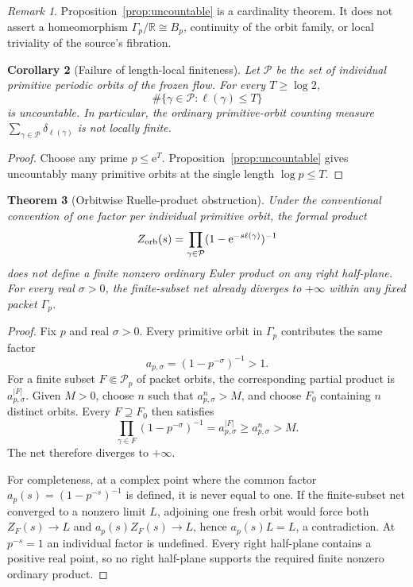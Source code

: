 \documentclass[11pt]{article}
\newtheorem{theorem}{Theorem}
\newtheorem{corollary}[theorem]{Corollary}
\theoremstyle{definition}
\theoremstyle{remark}
\newtheorem{remark}[theorem]{Remark}
\newcommand{\R}{\mathbb{R}}
\newcommand{\e}{\mathrm{e}}
\begin{document}
\begin{remark}
Proposition~\ref{prop:uncountable} is a cardinality theorem.  It does not
assert a homeomorphism \(\Gamma_p/\R\cong B_p\), continuity of the orbit
family, or local triviality of the source's fibration.
\end{remark}

\begin{corollary}[Failure of length-local finiteness]
\label{cor:notlocallyfinite}
Let \(\mathcal P\) be the set of individual primitive periodic orbits of the
frozen flow.  For every \(T\ge\log 2\),
\[
 \#\{\gamma\in\mathcal P:\ell(\gamma)\le T\}
\]
is uncountable.  In particular, the ordinary primitive-orbit counting measure
\(\sum_{\gamma\in\mathcal P}\delta_{\ell(\gamma)}\) is not locally finite.
\end{corollary}

\begin{proof}
Choose any prime \(p\le\e^T\).  Proposition~\ref{prop:uncountable} gives
uncountably many primitive orbits at the single length \(\log p\le T\).
\end{proof}

\begin{theorem}[Orbitwise Ruelle-product obstruction]
\label{thm:orbitproduct}
Under the conventional convention of one factor per individual primitive
orbit, the formal product
\begin{equation}
 Z_{\rm orb}(s)
   =\prod_{\gamma\in\mathcal P}
      (1-\e^{-s\ell(\gamma)})^{-1}
 \label{eq:orbitproduct}
\end{equation}
does not define a finite nonzero ordinary Euler product on any right
half-plane.  For every real \(\sigma>0\), the finite-subset net already
diverges to \(+\infty\) within any fixed packet \(\Gamma_p\).
\end{theorem}

\begin{proof}
Fix \(p\) and real \(\sigma>0\).  Every primitive orbit in \(\Gamma_p\)
contributes the same factor
\[
 a_{p,\sigma}=(1-p^{-\sigma})^{-1}>1.
\]
For a finite subset \(F\Subset\mathcal P_p\) of packet orbits, the
corresponding partial product is \(a_{p,\sigma}^{|F|}\).  Given \(M>0\),
choose \(n\) such that \(a_{p,\sigma}^n>M\), and choose \(F_0\) containing
\(n\) distinct orbits.  Every \(F\supseteq F_0\) then satisfies
\[
 \prod_{\gamma\in F}(1-p^{-\sigma})^{-1}
  =a_{p,\sigma}^{|F|}\ge a_{p,\sigma}^{n}>M.
\]
The net therefore diverges to \(+\infty\).

For completeness, at a complex point where the common factor
\(a_p(s)=(1-p^{-s})^{-1}\) is defined, it is never equal to one.  If the
finite-subset net converged to a nonzero limit \(L\), adjoining one fresh
orbit would force both \(Z_F(s)\to L\) and \(a_p(s)Z_F(s)\to L\), hence
\(a_p(s)L=L\), a contradiction.  At \(p^{-s}=1\) an individual factor is
undefined.  Every right half-plane contains a positive real point, so no
right half-plane supports the required finite nonzero ordinary product.
\end{proof}
\end{document}
